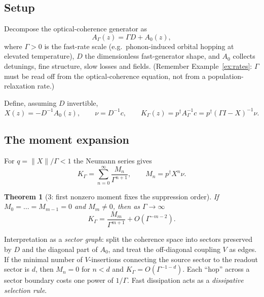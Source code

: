 \documentclass[11pt,a4paper]{article}
\newtheorem{theorem}{Theorem}[section]
\theoremstyle{remark}
\begin{document}
\subsection{Setup}

Decompose the optical-coherence generator as
\begin{equation}
A_\Gamma(z)=\Gamma D + A_0(z),
\end{equation}
where $\Gamma>0$ is the fast-rate scale (e.g.\ phonon-induced orbital hopping
at elevated temperature), $D$ the dimensionless fast-generator shape, and
$A_0$ collects detunings, fine structure, slow losses and fields.
(Remember Example~\ref{ex:rates}: $\Gamma$ must be read off from the
optical-coherence equation, not from a population-relaxation rate.)

Define, assuming $D$ invertible,
\begin{equation}
X(z)=-D^{-1}A_0(z),
\qquad
\nu=D^{-1}c,
\qquad
K_\Gamma(z)=p^\dagger A_\Gamma^{-1}c
          =p^\dagger(\Gamma I-X)^{-1}\nu .
\end{equation}

\subsection{The moment expansion}

For $q=\|X\|/\Gamma<1$ the Neumann series gives
\begin{equation}
K_\Gamma=\sum_{n=0}^\infty\frac{M_n}{\Gamma^{n+1}},
\qquad
M_n=p^\dagger X^n\nu .
\end{equation}

\begin{theorem}[3: first nonzero moment fixes the suppression order]
If $M_0=\dots=M_{m-1}=0$ and $M_m\neq0$, then as $\Gamma\to\infty$
\begin{equation}
K_\Gamma=\frac{M_m}{\Gamma^{m+1}}+O(\Gamma^{-m-2}).
\end{equation}
\end{theorem}

\begin{physbox}
Interpretation as a \emph{sector graph}: split the coherence space into
sectors preserved by $D$ and the diagonal part of $A_0$, and treat the
off-diagonal coupling $V$ as edges. If the minimal number of $V$-insertions
connecting the source sector to the readout sector is $d$, then $M_n=0$ for
$n<d$ and $K_\Gamma=O(\Gamma^{-1-d})$. Each ``hop'' across a sector boundary
costs one power of $1/\Gamma$. Fast dissipation acts as a
\emph{dissipative selection rule}.
\end{physbox}
\end{document}
